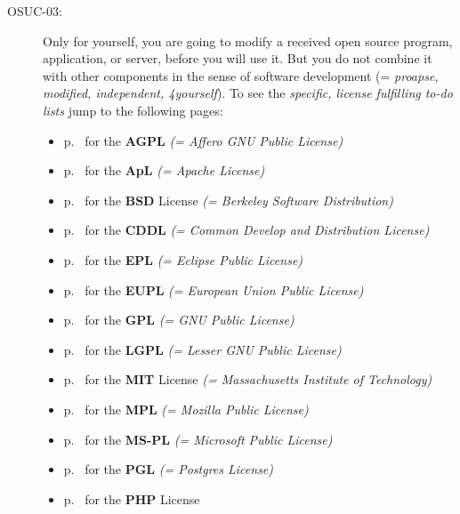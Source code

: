 \begin{description}
\item[OSUC-03:]\label{OSUC-03-DEF} Only for yourself, you are going to modify a
received open source program, application, or server, before you will use it.
But you do not combine it with other components in the sense of software
development (= \textit{proapse, modified, independent, 4yourself}).
To see the \textit{specific, license fulfilling to-do lists} jump to the
following pages:
   \begin{itemize}
    \item p.\ \pageref{OSUC-03-AGPL} for the \textbf{AGPL}
      \textit{(= Affero GNU Public License)} 
    \item p.\ \pageref{OSUC-03-Apache20} for the \textbf{ApL}
      \textit{(= Apache License)}
    \item p.\ \pageref{OSUC-03-BSD} for the \textbf{BSD} License
      \textit{(= Berkeley Software Distribution)}
    \item p.\ \pageref{OSUC-03-CDDL} for the \textbf{CDDL}
      \textit{(= Common Develop and Distribution License)}  
    \item p.\ \pageref{OSUC-03-EPL} for the \textbf{EPL}
      \textit{(= Eclipse Public License)}     
    \item p.\ \pageref{OSUC-03-EUPL} for the \textbf{EUPL}
      \textit{(= European Union Public License)} 
    \item p.\ \pageref{OSUC-03-GPL} for the \textbf{GPL}
       \textit{(= GNU Public License)} 
    \item p.\ \pageref{OSUC-03-LGPL} for the \textbf{LGPL}
      \textit{(= Lesser GNU Public License)}           
    \item p.\ \pageref{OSUC-03-MIT} for the \textbf{MIT} License
       \textit{(= Massachusetts Institute of Technology)} 
    \item p.\ \pageref{OSUC-03-MPL} for the \textbf{MPL}
      \textit{(= Mozilla Public License)}     
    \item p.\ \pageref{OSUC-03-MS-PL} for the \textbf{MS-PL}
      \textit{(= Microsoft Public License)} 
    \item p.\ \pageref{OSUC-03-PGL} for the \textbf{PGL}
      \textit{(= Postgres License)} 
    \item p.\ \pageref{OSUC-03-PHP} for the \textbf{PHP} License 
  \end{itemize}


\end{description}
